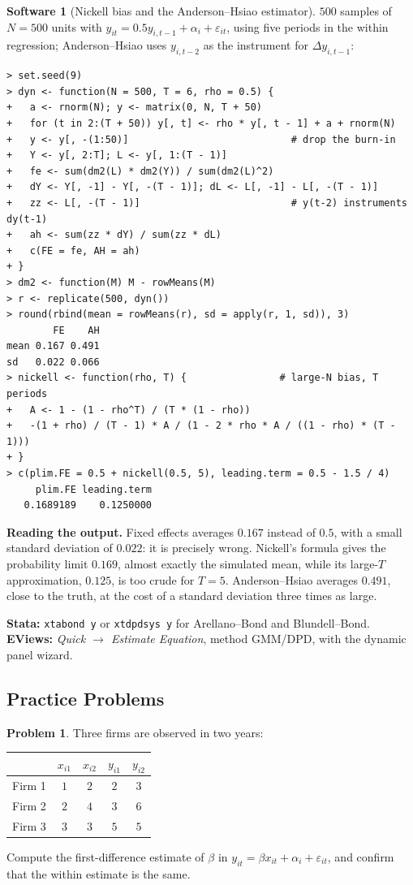 \documentclass[11pt,a4paper]{article}
\numberwithin{equation}{section}
\theoremstyle{definition}
\newtheorem{software}[thm]{Software}
\newtheorem{problemx}{Problem}[subsection]
\newenvironment{problem}{\begin{problemx}}{\end{problemx}}
\begin{document}
\begin{software}[Nickell bias and the Anderson--Hsiao estimator]
\label{sw:nickell}
$500$ samples of $N = 500$ units with $y_{it} = 0.5y_{i,t-1} + \alpha_i + \varepsilon_{it}$, using five periods in the within regression; Anderson--Hsiao uses $y_{i,t-2}$ as the instrument
for $\Delta y_{i,t-1}$:
{\small\begin{verbatim}
> set.seed(9)
> dyn <- function(N = 500, T = 6, rho = 0.5) {
+   a <- rnorm(N); y <- matrix(0, N, T + 50)
+   for (t in 2:(T + 50)) y[, t] <- rho * y[, t - 1] + a + rnorm(N)
+   y <- y[, -(1:50)]                            # drop the burn-in
+   Y <- y[, 2:T]; L <- y[, 1:(T - 1)]
+   fe <- sum(dm2(L) * dm2(Y)) / sum(dm2(L)^2)
+   dY <- Y[, -1] - Y[, -(T - 1)]; dL <- L[, -1] - L[, -(T - 1)]
+   zz <- L[, -(T - 1)]                          # y(t-2) instruments dy(t-1)
+   ah <- sum(zz * dY) / sum(zz * dL)
+   c(FE = fe, AH = ah)
+ }
> dm2 <- function(M) M - rowMeans(M)
> r <- replicate(500, dyn())
> round(rbind(mean = rowMeans(r), sd = apply(r, 1, sd)), 3)
        FE    AH
mean 0.167 0.491
sd   0.022 0.066
> nickell <- function(rho, T) {                # large-N bias, T periods
+   A <- 1 - (1 - rho^T) / (T * (1 - rho))
+   -(1 + rho) / (T - 1) * A / (1 - 2 * rho * A / ((1 - rho) * (T - 1)))
+ }
> c(plim.FE = 0.5 + nickell(0.5, 5), leading.term = 0.5 - 1.5 / 4)
     plim.FE leading.term 
   0.1689189    0.1250000 
\end{verbatim}}
\textbf{Reading the output.} Fixed effects averages $0.167$ instead of $0.5$, with a small standard deviation of $0.022$: it is precisely wrong. Nickell's formula gives
the probability limit $0.169$, almost exactly the simulated mean, while its large-$T$ approximation, $0.125$, is too crude for $T = 5$. Anderson--Hsiao averages $0.491$, close
to the truth, at the cost of a standard deviation three times as large.

\textbf{Stata:} \texttt{xtabond y} or \texttt{xtdpdsys y} for Arellano--Bond and Blundell--Bond. \textbf{EViews:} \emph{Quick $\to$ Estimate Equation}, method
GMM/DPD, with the dynamic panel wizard.
\end{software}

\subsection{Practice Problems}

\begin{problem}
Three firms are observed in two years:
\begin{center}
\begin{tabular}{lcccc}
& $x_{i1}$ & $x_{i2}$ & $y_{i1}$ & $y_{i2}$\\
\hline
Firm 1 & $1$ & $2$ & $2$ & $3$\\
Firm 2 & $2$ & $4$ & $3$ & $6$\\
Firm 3 & $3$ & $3$ & $5$ & $5$
\end{tabular}
\end{center}
Compute the first-difference estimate of $\beta$ in $y_{it} = \beta x_{it} + \alpha_i + \varepsilon_{it}$, and confirm that the within estimate is the same.
\end{problem}
\end{document}
